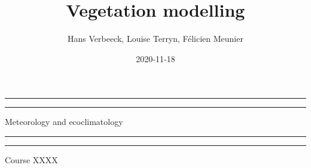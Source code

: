 \documentclass[oneside]{book}
\title{Vegetation modelling}
\author{Hans Verbeeck, Louise Terryn, Félicien Meunier}
\date{2020-11-18}
\begin{document}
\maketitle

\newcommand{\plogo}{\fbox{$\mathcal{PL}$}} %
\frontmatter


\begin{titlepage} %

	\centering %
	
	\scshape %
	
	\vspace*{\baselineskip} %
	
	
	\vspace{12\baselineskip}
	
	\rule{\textwidth}{1.6pt}\vspace*{-\baselineskip}\vspace*{2pt} %
	\rule{\textwidth}{0.4pt} %
	
	\vspace{0.75\baselineskip} %
	
	{\LARGE Meteorology and ecoclimatology\\} %
	
	\vspace{0.75\baselineskip} %
	
	\rule{\textwidth}{0.4pt}\vspace*{-\baselineskip}\vspace{3.2pt} %
	\rule{\textwidth}{1.6pt} %
	
	\vspace{2\baselineskip} %
	
	
	Course XXXX %
	
	\vspace*{3\baselineskip} %
	
	

\end{titlepage}
\end{document}
